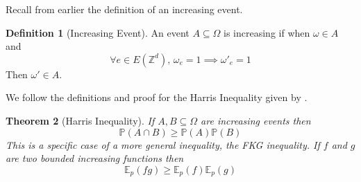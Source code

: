 \documentclass[a4paper,11pt]{article}
\newtheorem{theorem}{Theorem}[section]
\theoremstyle{definition}
\newtheorem{definition}[theorem]{Definition}
\newcommand{\ints}{\mathbb{Z}}
\begin{document}
Recall from earlier the definition of an increasing event.
\begin{definition}[Increasing Event]
	An event $ A \subseteq \Omega$ is increasing if when $\omega \in A$ and
	$$\forall e \in E(\ints^d) \text{, } \omega_e = 1 \implies \omega'_e = 1$$
	Then $\omega' \in A$. \\
	\end{definition}
We follow the definitions and proof for the Harris Inequality given by \cite{duminil2018introduction}.
\begin{theorem}[Harris Inequality]
If $A, B \subseteq \Omega$ are increasing events then 
$$\mathbb{P}(A \cap B) \geq \mathbb{P}(A)\mathbb{P}(B)$$
This is a specific case of a more general inequality, the FKG inequality.
If $f$ and $g$ are two bounded increasing functions then
$$ \mathbb{E}_p(fg) \geq \mathbb{E}_p(f)\mathbb{E}_p(g)$$
\end{theorem}
\end{document}
